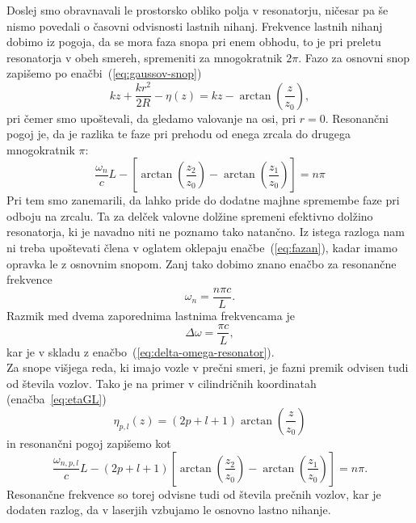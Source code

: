 Doslej smo obravnavali le prostorsko obliko polja v resonatorju, ničesar pa še nismo
povedali o časovni odvisnosti lastnih nihanj. Frekvence
lastnih nihanj dobimo iz pogoja, da se mora faza snopa pri enem obhodu,
to je pri preletu resonatorja v obeh smereh, spremeniti za mnogokratnik
$2\pi$. Fazo za osnovni snop zapišemo po enačbi~(\ref{eq:gaussov-snop})
\begin{equation}
kz+\frac{kr^{2}}{2R} -\eta(z) = kz-\arctan \left(\frac{z}{z_{0}}\right),
\label{eq:fazag}
\end{equation}
pri čemer smo upoštevali, da gledamo valovanje na osi, pri $r=0$. 
Resonančni pogoj je, da je razlika te faze pri prehodu od enega zrcala
do drugega mnogokratnik $\pi$: 
\begin{equation}
\frac{\omega_{n}}{c}L-\left[\arctan \left(\frac{z_{2}}{z_{0}}\right)-
\arctan\left(\frac{z_{1}}{z_{0}}\right)\right]=n\pi
\label{eq:fazan}
\end{equation}
Pri tem smo zanemarili, da lahko pride do dodatne majhne spremembe
faze pri odboju na zrcalu. Ta za delček valovne dolžine
spremeni efektivno dolžino resonatorja, ki je navadno niti ne poznamo
tako natančno. Iz istega razloga nam ni treba upoštevati člena
v oglatem oklepaju enačbe~(\ref{eq:fazan}), kadar imamo opravka le z osnovnim
snopom. Zanj tako dobimo znano enačbo za resonančne frekvence 
\begin{equation}
\omega_{n}=\frac{n\pi c}{L}.
\label{eq:omega}
\end{equation}
Razmik med dvema zaporednima lastnima frekvencama je 
\begin{equation}
\Delta\omega=\frac{\pi c}{L},
\label{eq:deltaomega}
\end{equation}
kar je v skladu z enačbo~(\ref{eq:delta-omega-resonator}). \\

\noindent
Za snope višjega reda, ki imajo vozle v prečni smeri, je fazni premik
odvisen tudi od števila vozlov. Tako je na primer v cilindričnih koordinatah
(enačba~\ref{eq:etaGL})
\begin{equation}
\eta_{p,l}(z)=(2p+l+1)\arctan\left(\frac{z}{z_{0}}\right)
\end{equation}
in resonančni pogoj zapišemo kot
\begin{equation}
\frac{\omega_{n,p,l}}{c}L-(2p+l+1)\left[\arctan\left(\frac{z_{2}}{z_{0}}\right)-
\arctan\left(\frac{z_{1}}{z_{0}}\right)\right]=n\pi.
\end{equation}
Resonančne frekvence so torej odvisne tudi od števila prečnih vozlov,
kar je dodaten razlog, da v laserjih vzbujamo le osnovno lastno nihanje.\\

